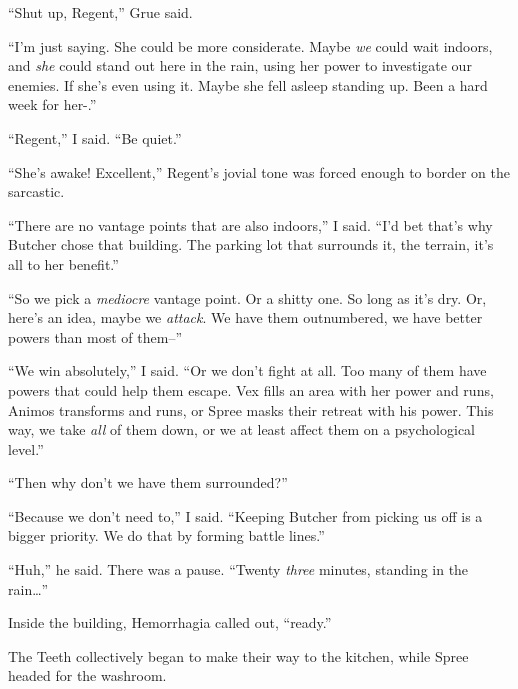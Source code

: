 ``Shut up, Regent,'' Grue said.



``I'm just saying.  She could be more considerate.  Maybe \emph{we} could wait indoors, and \emph{she} could stand out here in the rain, using her power to investigate our enemies.  If she's even using it.  Maybe she fell asleep standing up.  Been a hard week for her-.''



``Regent,'' I said.  ``Be quiet.''



``She's awake!  Excellent,'' Regent's jovial tone was forced enough to border on the sarcastic.



``There are no vantage points that are also indoors,'' I said.  ``I'd bet that's why Butcher chose that building.  The parking lot that surrounds it, the terrain, it's all to her benefit.''



``So we pick a \emph{mediocre} vantage point.  Or a shitty one.  So long as it's dry.  Or, here's an idea, maybe we \emph{attack}.  We have them outnumbered, we have better powers than most of them--''



``We win absolutely,'' I said.  ``Or we don't fight at all.  Too many of them have powers that could help them escape.  Vex fills an area with her power and runs, Animos transforms and runs, or Spree masks their retreat with his power.  This way, we take\emph{ }\emph{all} of them down, or we at least affect them on a psychological level.''



``Then why don't we have them surrounded?''



``Because we don't need to,'' I said.  ``Keeping Butcher from picking us off is a bigger priority.  We do that by forming battle lines.''



``Huh,'' he said.  There was a pause.  ``Twenty \emph{three} minutes, standing in the rain\ldots''



Inside the building, Hemorrhagia called out, ``\ldotsst ready.''



The Teeth collectively began to make their way to the kitchen, while Spree headed for the washroom.



